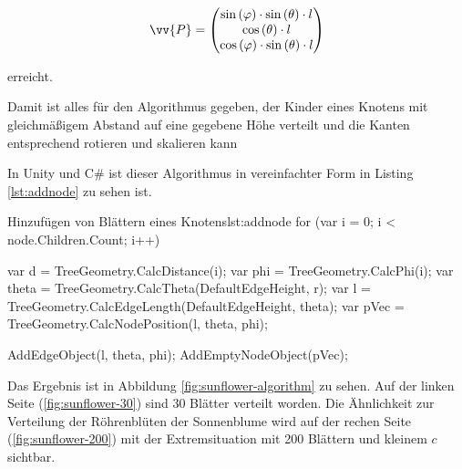 \begin{equation}
  \vv{P} =
  \begin{pmatrix}
    \sin\left(\varphi\right) \cdot \sin\left(\theta\right) \cdot l\\
    \cos\left(\theta\right) \cdot l\\
    \cos\left(\varphi\right) \cdot \sin\left(\theta\right) \cdot l
  \end{pmatrix}
\end{equation}

erreicht.

Damit ist alles für den Algorithmus gegeben, der Kinder eines Knotens mit gleichmäßigem Abstand auf eine gegebene Höhe verteilt und die Kanten entsprechend rotieren und skalieren kann

In Unity und C\# ist dieser Algorithmus in vereinfachter Form in Listing \ref{lst:addnode} zu sehen ist.

\begin{codesnippet}{Hinzufügen von Blättern eines Knotens}{lst:addnode}
for (var i = 0; i < node.Children.Count; i++)
{
    var d = TreeGeometry.CalcDistance(i);
    var phi = TreeGeometry.CalcPhi(i);
    var theta = TreeGeometry.CalcTheta(DefaultEdgeHeight, r);
    var l = TreeGeometry.CalcEdgeLength(DefaultEdgeHeight, theta);
    var pVec = TreeGeometry.CalcNodePosition(l, theta, phi);

    AddEdgeObject(l, theta, phi);
    AddEmptyNodeObject(pVec);
}
\end{codesnippet}

Das Ergebnis ist in Abbildung \ref{fig:sunflower-algorithm} zu sehen. Auf der linken Seite (\ref{fig:sunflower-30}) sind 30 Blätter verteilt worden. Die Ähnlichkeit zur Verteilung der Röhrenblüten der Sonnenblume wird auf der rechen Seite (\ref{fig:sunflower-200}) mit der Extremsituation mit 200 Blättern und kleinem $c$ sichtbar.


